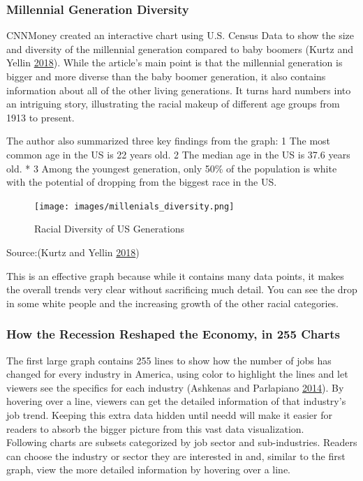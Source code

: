 \documentclass[]{book}
\begin{document}
\hypertarget{millennial-generation-diversity}{%
\subsubsection{Millennial Generation Diversity}\label{millennial-generation-diversity}}

CNNMoney created an interactive chart using U.S. Census Data to show the size and diversity of the millennial generation compared to baby boomers (Kurtz and Yellin \protect\hyperlink{ref-age_groups}{2018}). While the article's main point is that the millennial generation is bigger and more diverse than the baby boomer generation, it also contains information about all of the other living generations. It turns hard numbers into an intriguing story, illustrating the racial makeup of different age groups from 1913 to present.

The author also summarized three key findings from the graph:
1\textbar{} The most common age in the US is 22 years old.
2\textbar{} The median age in the US is 37.6 years old. *
3\textbar{} Among the youngest generation, only 50\% of the population is white with the potential of dropping from the biggest race in the US.

\begin{figure}
\centering
\texttt{[image: images/millenials\_diversity.png]}
\caption{Racial Diversity of US Generations}
\end{figure}

Source:(Kurtz and Yellin \protect\hyperlink{ref-age_groups}{2018})

This is an effective graph because while it contains many data points, it makes the overall trends very clear without sacrificing much detail. You can see the drop in some white people and the increasing growth of the other racial categories.

\hypertarget{how-the-recession-reshaped-the-economy-in-255-charts}{%
\subsubsection{How the Recession Reshaped the Economy, in 255 Charts}\label{how-the-recession-reshaped-the-economy-in-255-charts}}

The first large graph contains 255 lines to show how the number of jobs has changed for every industry in America, using color to highlight the lines and let viewers see the specifics for each industry (Ashkenas and Parlapiano \protect\hyperlink{ref-recession_economy}{2014}). By hovering over a line, viewers can get the detailed information of that industry's job trend. Keeping this extra data hidden until needd will make it easier for readers to absorb the bigger picture from this vast data visualization.\\
Following charts are subsets categorized by job sector and sub-industries. Readers can choose the industry or sector they are interested in and, similar to the first graph, view the more detailed information by hovering over a line.
\end{document}
